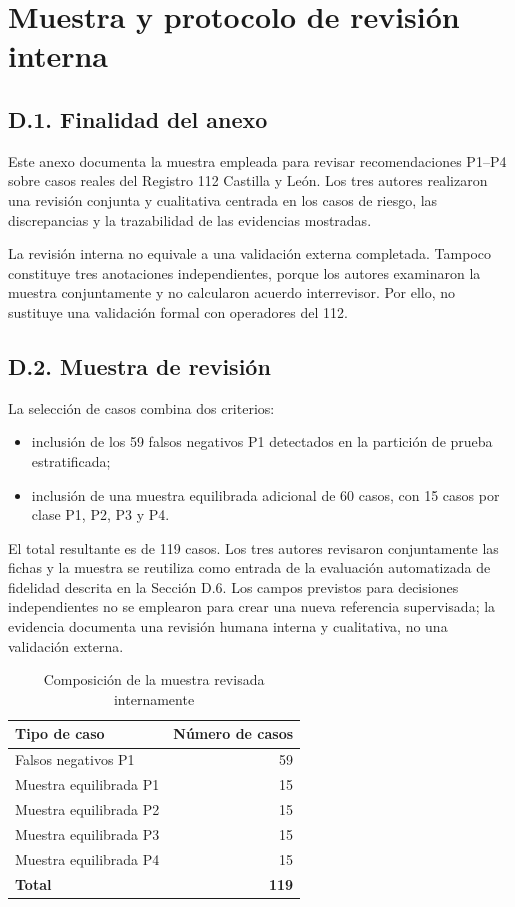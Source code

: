 \chapter{Muestra y protocolo de revisión interna}
\label{cap:anexod}

\section*{D.1. Finalidad del anexo}

Este anexo documenta la muestra empleada para revisar recomendaciones P1--P4 sobre
casos reales del Registro 112 Castilla y León. Los tres autores realizaron una revisión
conjunta y cualitativa centrada en los casos de riesgo, las discrepancias y la trazabilidad
de las evidencias mostradas.

La revisión interna no equivale a una validación externa completada. Tampoco constituye
tres anotaciones independientes, porque los autores examinaron la muestra conjuntamente y
no calcularon acuerdo interrevisor. Por ello, no sustituye una validación formal con
operadores del 112.

\section*{D.2. Muestra de revisión}

La selección de casos combina dos criterios:

\begin{itemize}
    \item inclusión de los 59 falsos negativos P1 detectados en la partición de prueba estratificada;
    \item inclusión de una muestra equilibrada adicional de 60 casos, con 15 casos por
    clase P1, P2, P3 y P4.
\end{itemize}

El total resultante es de 119 casos. Los tres autores revisaron conjuntamente las fichas
y la muestra se reutiliza como entrada de la evaluación automatizada de fidelidad descrita
en la Sección D.6. Los campos previstos para decisiones independientes no se emplearon
para crear una nueva referencia supervisada; la evidencia documenta una revisión humana
interna y cualitativa, no una validación externa.

\begin{table}[ht]
\centering
\caption{Composición de la muestra revisada internamente}
\label{tab:anexod-muestra}
\small
\begin{tabular}{|l|r|}
\hline
\textbf{Tipo de caso} & \textbf{Número de casos} \\ \hline
Falsos negativos P1 & 59 \\ \hline
Muestra equilibrada P1 & 15 \\ \hline
Muestra equilibrada P2 & 15 \\ \hline
Muestra equilibrada P3 & 15 \\ \hline
Muestra equilibrada P4 & 15 \\ \hline
\textbf{Total} & \textbf{119} \\ \hline
\end{tabular}
\end{table}

